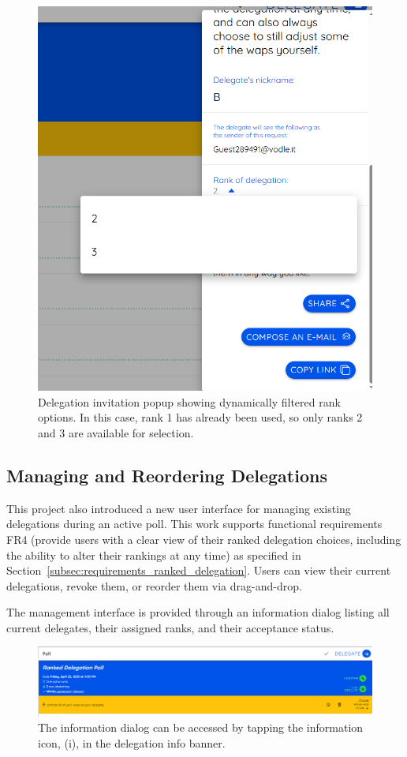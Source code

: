 \begin{figure}[H]
  \centering
  \includegraphics[width=0.4\linewidth]{../common/vodle_screenshots/ranked_inv.png}
  \caption{Delegation invitation popup showing dynamically filtered rank options. In this case, rank 1 has already been used, so only ranks 2 and 3 are available for selection.}
\end{figure}

\subsection{Managing and Reordering Delegations}

This project also introduced a new user interface for managing existing delegations during an active poll. This work supports functional requirements FR4 (provide users with a clear view of their ranked delegation choices, including the ability to alter their rankings at any time) as specified in Section~\ref{subsec:requirements_ranked_delegation}. Users can view their current delegations, revoke them, or reorder them via drag-and-drop.

The management interface is provided through an information dialog listing all current delegates, their assigned ranks, and their acceptance status.

\begin{figure}[H]
  \centering
  \includegraphics[width=\linewidth]{../common/vodle_screenshots/ranked_where_info_button.png}
  \caption{The information dialog can be accessed by tapping the information icon, (i), in the delegation info banner.}
\end{figure}

